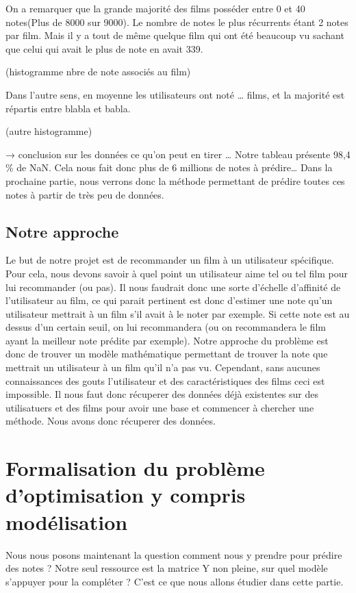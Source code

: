 \documentclass[a4paper,10pt]{article}
\begin{document}
On a remarquer que la grande majorité des films posséder entre 0 et 40 notes(Plus de 8000 sur 9000). 
Le nombre de notes le plus récurrents étant 2 notes par film. Mais il y a tout de même quelque film qui ont été
beaucoup vu sachant que celui qui avait le plus de note en avait 339.

(histogramme nbre de note associés au film)

Dans l’autre sens, en moyenne les utilisateurs ont noté … films, et la majorité est répartis entre blabla et babla.

(autre histogramme)

→ conclusion sur les données ce qu’on peut en tirer …
Notre tableau présente 98,4 \% de NaN. Cela nous fait donc plus de 6 millions de notes à prédire… Dans la prochaine partie,
nous verrons donc la méthode permettant de prédire toutes ces notes à partir de très peu de données.

\subsection{Notre approche}
Le but de notre projet est de recommander un film à un utilisateur spécifique. 
Pour cela, nous devons savoir à quel point un utilisateur aime tel ou tel film pour lui recommander (ou pas). 
Il nous faudrait donc une sorte d'échelle d'affinité de l'utilisateur au film, ce qui parait pertinent est donc d'estimer une note qu'un utilisateur mettrait à un film s'il avait à le noter par exemple. 
Si cette note est au dessus d'un certain seuil, on lui recommandera (ou on recommandera le film ayant la meilleur note prédite par exemple). 
Notre approche du problème est donc de trouver un modèle mathématique permettant de trouver la note que mettrait un utilisateur à un film qu'il n'a pas vu. 
Cependant, sans aucunes connaissances des gouts l'utilisateur et des caractéristiques des films ceci est impossible. Il nous faut donc récuperer des données déjà existentes sur des utilisatuers et des films pour avoir une base et commencer à chercher une méthode.  
Nous avons donc récuperer des données.

\section{Formalisation du problème d'optimisation y compris modélisation}

Nous nous posons maintenant la question comment nous y prendre pour prédire des notes ?
Notre seul ressource est la matrice Y non pleine, sur quel modèle s'appuyer pour la compléter ?
C'est ce que nous allons étudier dans cette partie.
\end{document}
